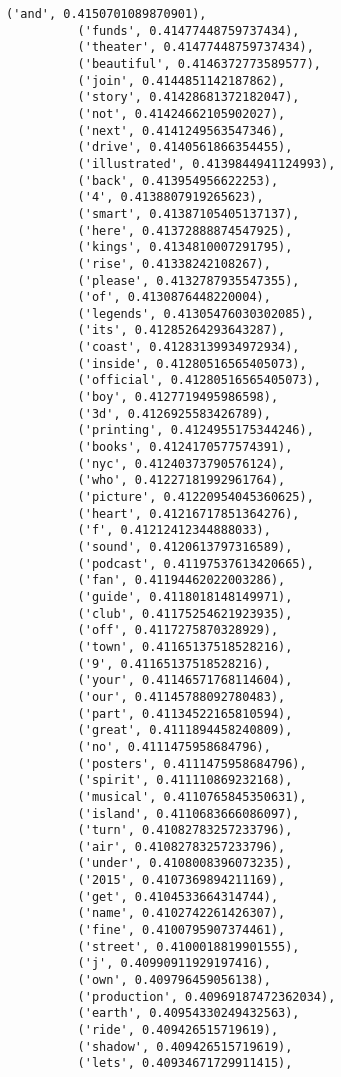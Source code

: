 \documentclass[11pt]{article}
\begin{document}
\begin{Verbatim}[commandchars=\\\{\}]
          ('and', 0.4150701089870901),
          ('funds', 0.41477448759737434),
          ('theater', 0.41477448759737434),
          ('beautiful', 0.4146372773589577),
          ('join', 0.4144851142187862),
          ('story', 0.41428681372182047),
          ('not', 0.41424662105902027),
          ('next', 0.4141249563547346),
          ('drive', 0.4140561866354455),
          ('illustrated', 0.4139844941124993),
          ('back', 0.413954956622253),
          ('4', 0.4138807919265623),
          ('smart', 0.41387105405137137),
          ('here', 0.41372888874547925),
          ('kings', 0.4134810007291795),
          ('rise', 0.41338242108267),
          ('please', 0.4132787935547355),
          ('of', 0.4130876448220004),
          ('legends', 0.41305476030302085),
          ('its', 0.41285264293643287),
          ('coast', 0.41283139934972934),
          ('inside', 0.41280516565405073),
          ('official', 0.41280516565405073),
          ('boy', 0.4127719495986598),
          ('3d', 0.4126925583426789),
          ('printing', 0.4124955175344246),
          ('books', 0.4124170577574391),
          ('nyc', 0.41240373790576124),
          ('who', 0.41227181992961764),
          ('picture', 0.41220954045360625),
          ('heart', 0.41216717851364276),
          ('f', 0.41212412344888033),
          ('sound', 0.4120613797316589),
          ('podcast', 0.41197537613420665),
          ('fan', 0.41194462022003286),
          ('guide', 0.4118018148149971),
          ('club', 0.41175254621923935),
          ('off', 0.4117275870328929),
          ('town', 0.41165137518528216),
          ('9', 0.41165137518528216),
          ('your', 0.41146571768114604),
          ('our', 0.41145788092780483),
          ('part', 0.41134522165810594),
          ('great', 0.4111894458240809),
          ('no', 0.4111475958684796),
          ('posters', 0.4111475958684796),
          ('spirit', 0.411110869232168),
          ('musical', 0.4110765845350631),
          ('island', 0.4110683666086097),
          ('turn', 0.41082783257233796),
          ('air', 0.41082783257233796),
          ('under', 0.4108008396073235),
          ('2015', 0.4107369894211169),
          ('get', 0.4104533664314744),
          ('name', 0.4102742261426307),
          ('fine', 0.4100795907374461),
          ('street', 0.4100018819901555),
          ('j', 0.40990911929197416),
          ('own', 0.409796459056138),
          ('production', 0.40969187472362034),
          ('earth', 0.40954330249432563),
          ('ride', 0.409426515719619),
          ('shadow', 0.409426515719619),
          ('lets', 0.40934671729911415),

\end{Verbatim}
\end{document}
